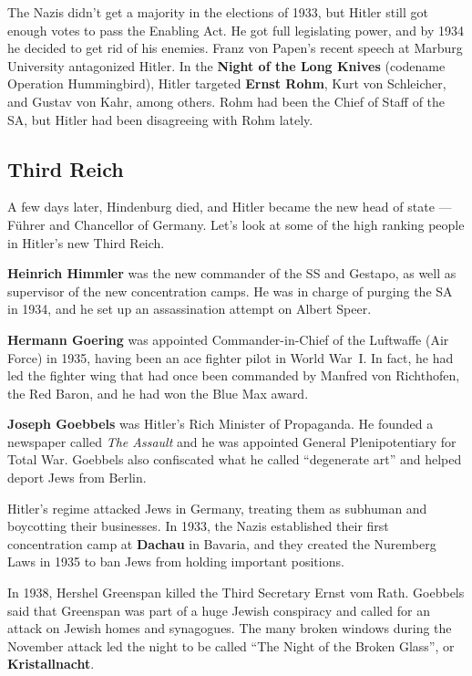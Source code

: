 The Nazis didn't get a majority in the elections of 1933, but Hitler still got enough votes to pass the Enabling Act.
He got full legislating power, and by 1934 he decided to get rid of his enemies.
Franz von Papen's recent speech at Marburg University antagonized Hitler.
In the \textbf{Night of the Long Knives} (codename Operation Hummingbird),
Hitler targeted \textbf{Ernst Rohm}, Kurt von Schleicher, and Gustav von Kahr, among others.
Rohm had been the Chief of Staff of the SA, but Hitler had been disagreeing with Rohm lately.

\subsection*{Third Reich}

A few days later, Hindenburg died, and Hitler became the new head of state --- F\"uhrer and Chancellor of Germany.
Let's look at some of the high ranking people in Hitler's new Third Reich.

\textbf{Heinrich Himmler} was the new commander of the SS and Gestapo,
as well as supervisor of the new concentration camps.
He was in charge of purging the SA in 1934,
and he set up an assassination attempt on Albert Speer.

\textbf{Hermann Goering} was appointed Commander-in-Chief of the Luftwaffe (Air Force) in 1935,
having been an ace fighter pilot in World War~I.
In fact, he had led the fighter wing that had once been commanded by Manfred von Richthofen, the Red Baron,
and he had won the Blue Max award.

\textbf{Joseph Goebbels} was Hitler's Rich Minister of Propaganda.
He founded a newspaper called \textit{The Assault} and he was appointed General Plenipotentiary for Total War.
Goebbels also confiscated what he called ``degenerate art'' and helped deport Jews from Berlin.

Hitler's regime attacked Jews in Germany, treating them as subhuman and boycotting their businesses.
In 1933, the Nazis established their first concentration camp at \textbf{Dachau} in Bavaria,
and they created the Nuremberg Laws in 1935 to ban Jews from holding important positions.

In 1938, Hershel Greenspan killed the Third Secretary Ernst vom Rath.
Goebbels said that Greenspan was part of a huge Jewish conspiracy and
called for an attack on Jewish homes and synagogues.
The many broken windows during the November attack led the night to be called ``The Night of the Broken Glass'',
or \textbf{Kristallnacht}.

